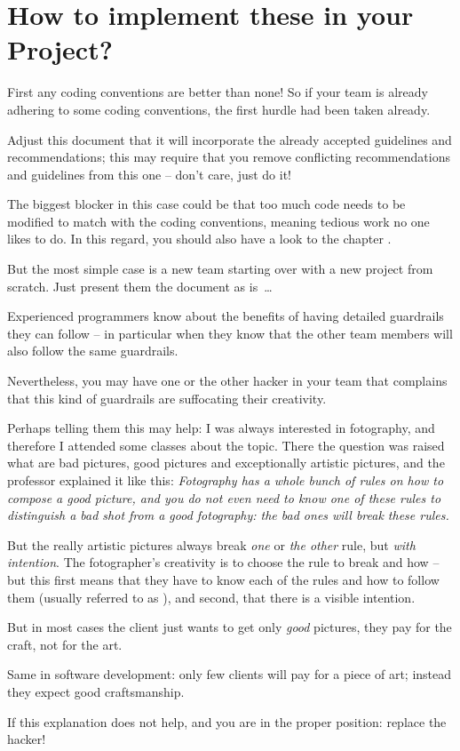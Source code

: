 \section{How to implement these  in your Project?}\label{sec:HowToImplement}
First any coding conventions are better than none! So if your team is already adhering to some coding conventions, the first hurdle had been taken already.

Adjust this document that it will incorporate the already accepted guidelines and recommendations; this may require that you remove conflicting recommendations and guidelines from this one – don't care, just do it!

The biggest blocker in this case could be that too much code needs to be modified to match with the coding conventions, meaning tedious work no one likes to do. In this regard, you should also have a look to the chapter .

But the most simple case is a new team starting over with a new project from scratch. Just present them the document as is~…

Experienced programmers know about the benefits of having detailed guard\-rails they can follow – in particular when they know that the other team members will also follow the same guardrails.

Nevertheless, you may have one or the other hacker in your team that complains that this kind of guardrails are suffocating their creativity.

Perhaps telling them this may help: I was always interested in fotography, and therefore I attended some classes about the topic. There the question was raised what are bad pictures, good pictures and exceptionally artistic pictures, and the professor explained it like this: \textit{Fotography has a whole bunch of rules on how to compose a good picture, and you do not even need to know one of these rules to distinguish a bad shot from a good fotography: the bad ones will break these rules.}

But the really artistic pictures always break \textit{one} or \textit{the other} rule, but \textit{with intention}. The fotographer's creativity is to choose the rule to break and how – but this first means that they have to know each of the rules and how to follow them (usually referred to as ), and second, that there is a visible intention.

But in most cases the client just wants to get only \textit{good} pictures, they pay for the craft, not for the art.

Same in software development: only few clients will pay for a piece of art; instead they expect good craftsmanship.

If this explanation does not help, and you are in the proper position: replace the hacker!

